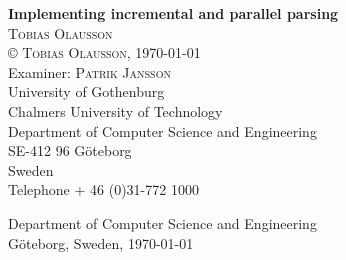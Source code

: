 \begin{titlepage}
\noindent \textbf{Implementing incremental and parallel parsing}\\
\noindent \textsc{Tobias Olausson} \\

\noindent \copyright \textsc{ Tobias Olausson}, \monthdate\today \\

\noindent Examiner: \textsc{Patrik Jansson} \\

\noindent University of Gothenburg \\
Chalmers University of Technology \\
Department of Computer Science and Engineering \\
SE-412 96 Göteborg \\
Sweden \\
Telephone + 46 (0)31-772 1000 \\

\vfill

\noindent Department of Computer Science and Engineering \\
Göteborg, Sweden, \monthdate\today
\end{titlepage}
